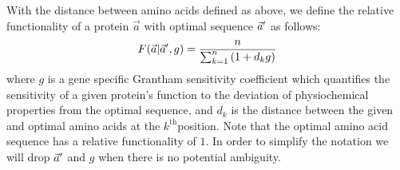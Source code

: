 

With the distance between amino acids defined as above, we define the relative functionality of a protein $\vec{a}$ with optimal sequence $\vec{a}^\prime$ as follows:
\begin{equation}
F(\vec{a}| \vec{a}^\prime,g)  =  \frac{n}{\sum_{k=1}^n{(1+d_kg)}} \label{eq:harmonic}
\end{equation}
where $g$ is a gene specific Grantham sensitivity coefficient which quantifies the sensitivity of a given protein's function to the deviation of physiochemical properties from the optimal sequence, and $d_k$ is the distance between the given and optimal amino acids at the $k^{\text{th}}$position.
Note that the optimal amino acid sequence has a relative functionality of $1$. 
In order to simplify the notation we will drop $\vec{a}^\prime$ and $g$ when there is no potential ambiguity.


